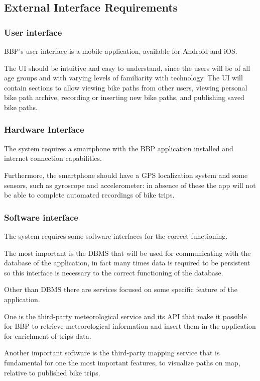 \subsection{External Interface Requirements}

\subsubsection{User interface}

BBP’s user interface is a mobile application, available for Android and iOS. 

The UI should be intuitive and easy to understand, since the users will be of all age groups and with varying levels of familiarity with technology. 
The UI will contain sections to allow viewing bike paths from other users, viewing personal bike path archive, recording or inserting new bike paths, and publishing saved bike paths.

\subsubsection{Hardware Interface}

The system requires a smartphone with the BBP application installed and internet connection capabilities. 

Furthermore, the smartphone should have a GPS localization system and some sensors, such as gyroscope and accelerometer: in absence of these the app will not be able to complete automated recordings of bike trips.

\subsubsection{Software interface}

The system requires some software interfaces for the correct functioning.

The most important is the DBMS that will be used for communicating with the database of the application, in fact many times data is required to be persistent so this interface is necessary to the correct functioning of the database.

Other than DBMS there are services focused on some specific feature of the application. 

One is the third-party meteorological service and its API that make it possible for BBP to retrieve meteorological information and insert them in the application for enrichment of trips data. 

Another important software is the third-party mapping service that is fundamental for one the most important features, to visualize paths on map, relative to published bike trips.

